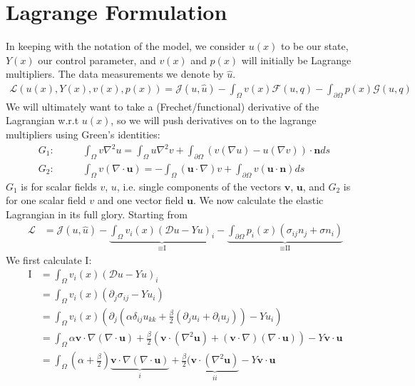 \documentclass{article}
\newcommand{\bu}{\mathbf{u}}
\newcommand{\bn}{\mathbf{n}}
\newcommand{\bv}{\mathbf{v}}
\begin{document}
\iffalse
\section{Lagrange Formulation}
In keeping with the notation of the model, we consider $u(x)$ to be our state, $Y(x)$ our control parameter, and $v(x)$ and $p(x)$ will initially be Lagrange multipliers. The data measurements we denote by $\hat u$.
\begin{align*}
    \mathcal{L}(u(x), Y(x), v(x), p(x)) = \mathcal{J}(u,\hat u) - \int_{\Omega} v(x)\mathcal{F}(u, q) - \int_{\partial\Omega}p(x)\mathcal{G}(u, q)
\end{align*}
We will ultimately want to take a (Frechet/functional) derivative of the Lagrangian w.r.t $u(x)$, so we will push derivatives on to the lagrange multipliers using Green's identities:
\begin{align*}
    G_1: &\quad\quad \int_\Omega v \nabla^2 u = \int_\Omega u \nabla^2 v + \int_{\partial\Omega} \left( v(\nabla u) - u(\nabla v)\right)\cdot \bn ds \
    \\
    G_2: &\quad\quad \int_\Omega v \left( \nabla\cdot \bu\right) = -\int_\Omega  \left(\bu\cdot\nabla\right)v + \int_{\partial\Omega} v(\bu\cdot\bn) ds
\end{align*}
$G_1$ is for scalar fields $v$, $u$, i.e. single components of the vectors $\bv$, $\bu$, and $G_2$ is for one scalar field $v$ and one vector field $\bu$.
We now calculate the elastic Lagrangian in its full glory. Starting from 
\begin{align*}
    \mathcal{L} &= \mathcal{J}(u,\hat u) - \underbrace{\int_{\Omega} v_i(x) \left(\mathcal{D}u - Yu \right)_i}_{\equiv \text{I}} - \underbrace{\int_{\partial\Omega}p_i(x)\left(\sigma_{ij}n_j + \sigma n_i\right)}_{\equiv \text{II}}
\end{align*}
We first calculate I:
\begin{align*}
    \text{I} &= \int_{\Omega} v_i(x) \left(\mathcal{D}u - Yu \right)_i
    \\
    &=\int_{\Omega} v_i(x) \left(\partial_j\sigma_{ij} - Yu_i \right)
    \\
    &=\int_{\Omega} v_i(x) \left(\partial_j\left(\alpha\delta_{ij}u_{kk}+\frac{\beta}{2}(\partial_j u_i + \partial_i u_j)\right) - Yu_i \right)
    \\
    &=\int_{\Omega}\alpha \bv\cdot\nabla (\nabla\cdot\bu)+\frac{\beta}{2}\left(\bv\cdot(\nabla^2 \bu) +(\bv\cdot\nabla)(\nabla\cdot\bu)\right) - Y\bv\cdot\bu 
    \\
    &=\int_{\Omega}\left(\alpha+\frac{\beta}{2}\right) \underbrace{\bv\cdot\nabla (\nabla\cdot\bu)}_{i}+\frac{\beta}{2}(\underbrace{\bv\cdot(\nabla^2 \bu)}_{ii} - Y\bv\cdot\bu 
\end{align*}
\end{document}
